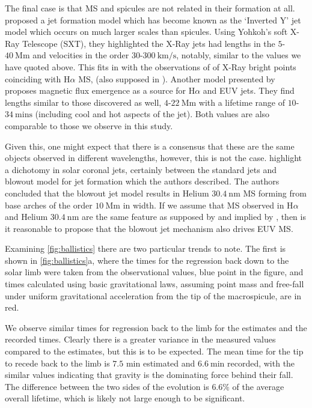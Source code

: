 The final case is that MS and spicules are not related in their formation at all. \cite{Shibata1992} proposed a jet formation model which has become known as the `Inverted Y' jet model which occurs on much larger scales than spicules. Using Yohkoh's soft X-Ray Telescope (SXT), they highlighted the X-Ray jets had lengths in the $5$-$40\ \textrm{Mm}$ and velocities in the order $30$-$300\ \textrm{km/s}$, notably, similar to the values we have quoted above. This fits in with the observations of \cite{Moore1977} of X-Ray bright points coinciding with H$\alpha$ MS, (also supposed in \cite{Kamio2010}). Another model presented by \cite{Jiang2007} proposes magnetic flux emergence as a source for H$\alpha$ and EUV jets. They find lengths similar to those discovered as well, $4$-$22\ \textrm{Mm}$ with a lifetime range of $10$-$34\ \textrm{mins}$ (including cool and hot aspects of the jet). Both values are also comparable to those we observe in this study.

Given this, one might expect that there is a consensus that these are the same objects observed in different wavelengths, however, this is not the case. \cite{Moore2010} highlight a dichotomy in solar coronal jets, certainly between the standard jets \cite{Shibata1992} and blowout model for jet formation which the authors described. The authors concluded that the blowout jet model results in Helium $30.4\ \textrm{nm}$ MS forming from base arches of the order $10\ \textrm{Mm}$ in width. If we assume that MS observed in H$\alpha$ and Helium $30.4\ \textrm{nm}$ are the same feature as supposed by \cite{LaBonte79} and implied by \cite{Parenti2002}, then is it reasonable to propose that the blowout jet mechanism also drives EUV MS.

Examining \cref{fig:ballistics} there are two particular trends to note. The first is shown in \cref{fig:ballistics}a, where the times for the regression back down to the solar limb were taken from the observational values, blue point in the figure, and times calculated using basic gravitational laws, assuming point mass and free-fall under uniform gravitational acceleration from the tip of the macrospicule, are in red. 

We observe similar times for regression back to the limb for the estimates and the recorded times. Clearly there is a greater variance in the measured values compared to the estimates, but this is to be expected. The mean time for the tip to recede back to the limb is $7.5$ min estimated and $6.6\ \textrm{min}$ recorded, with the similar values indicating that gravity is the dominating force behind their fall. The difference between the two sides of the evolution is $6.6\%$ of the average overall lifetime, which is likely not large enough to be significant. 

